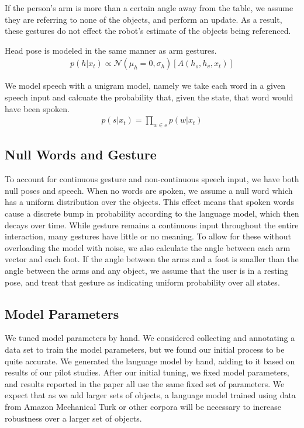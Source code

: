 \documentclass[graybox]{svmult}
\begin{document}
If the person's arm is more than a certain angle away from the table,
we assume they are referring to none of the objects, and perform an
update.  As a result, these gestures do not effect the robot's
estimate of the objects being referenced.


Head pose is modeled in the same manner as arm gestures.
\begin{align}
p(h | x_t) \propto \mathcal{N}(\mu_h=0, \sigma_h)[A(h_o, h_v, x_t)]
\end{align}



We model speech with a unigram model, namely we
take each word in a given speech input and calcuate the probability that, given the state, that word would have been spoken.
\begin{align}
p(s |x_t) = \displaystyle \prod_{w \in s} p(w | x_t)
\end{align}


\subsection{Null Words and Gesture}

To account for continuous gesture and non-continuous speech input, we
have both null poses and speech.  When no words are spoken, we assume
a null word which has a uniform distribution over the objects.  This
effect means that spoken words cause a discrete bump in probability
according to the language model, which then decays over time. While
gesture remains a continuous input throughout the entire interaction,
many gestures have little or no meaning. To allow for these without
overloading the model with noise, we also calculate the angle between
each arm vector and each foot. If the angle between the arms and a
foot is smaller than the angle between the arms and any object, we
assume that the user is in a resting pose, and treat that gesture as
indicating uniform probability over all states.

\subsection{Model Parameters}

We tuned model parameters by hand.  We considered collecting and
annotating a data set to train the model parameters, but we found our
initial process to be quite accurate. We generated the language model
by hand, adding to it based on results of our pilot
studies. After our initial tuning, we fixed
  model parameters, and results reported in the paper all use the same
  fixed set of parameters. We expect that as we add
larger sets of objects, a language model trained using data from
Amazon Mechanical Turk or other corpora will be necessary to increase
robustness over a larger set of objects.  
\end{document}
